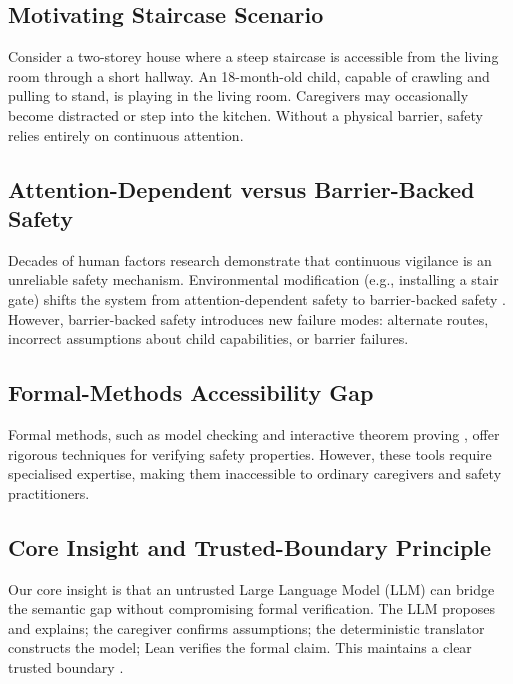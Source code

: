 \subsection{Motivating Staircase Scenario}
Consider a two-storey house where a steep staircase is accessible from the living room through a short hallway. An 18-month-old child, capable of crawling and pulling to stand, is playing in the living room. Caregivers may occasionally become distracted or step into the kitchen. Without a physical barrier, safety relies entirely on continuous attention.

\subsection{Attention-Dependent versus Barrier-Backed Safety}
Decades of human factors research \cite{parasuraman1997humans, reason1990human} demonstrate that continuous vigilance is an unreliable safety mechanism. Environmental modification (e.g., installing a stair gate) shifts the system from attention-dependent safety to barrier-backed safety \cite{leveson2011engineering}. However, barrier-backed safety introduces new failure modes: alternate routes, incorrect assumptions about child capabilities, or barrier failures.

\subsection{Formal-Methods Accessibility Gap}
Formal methods, such as model checking \cite{baier2008principles} and interactive theorem proving \cite{moura2021lean}, offer rigorous techniques for verifying safety properties. However, these tools require specialised expertise, making them inaccessible to ordinary caregivers and safety practitioners.

\subsection{Core Insight and Trusted-Boundary Principle}
Our core insight is that an untrusted Large Language Model (LLM) can bridge the semantic gap without compromising formal verification. The LLM proposes and explains; the caregiver confirms assumptions; the deterministic translator constructs the model; Lean verifies the formal claim. This maintains a clear trusted boundary \cite{necula1997proof}.

